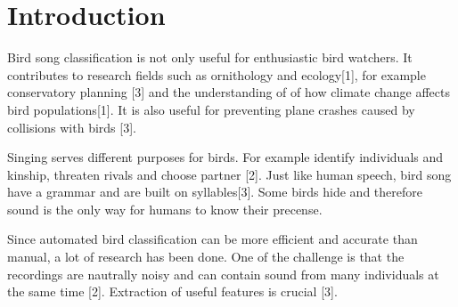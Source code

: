 \section{Introduction}
Bird song classification is not only useful for enthusiastic bird watchers.
It contributes to research fields such as ornithology and ecology[1], for
example conservatory planning [3] and the understanding of of how climate
change affects bird populations[1]. It is also useful for preventing plane
crashes caused by collisions with birds [3].

Singing serves different purposes for birds. For example identify individuals
and kinship, threaten rivals and choose partner [2]. Just like human speech,
bird song have a grammar and are built on syllables[3]. Some birds hide and
therefore sound is the only way for humans to know their precense.

Since automated bird classification can be more efficient and accurate than
manual, a lot of research has been done. One of the challenge is that the
recordings are nautrally noisy and can contain sound from many individuals
at the same time [2]. Extraction of useful features is crucial [3].
